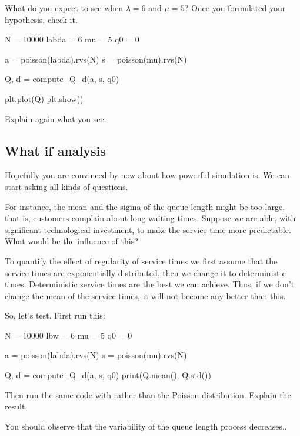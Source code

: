 \begin{exercise}
What do you expect to see when $\lambda=6$ and $\mu=5$? Once you formulated your hypothesis, check it.

\begin{pyverbatim}
N = 10000
labda = 6
mu = 5
q0 = 0

a = poisson(labda).rvs(N)
s = poisson(mu).rvs(N)

Q, d = compute_Q_d(a, s, q0)

plt.plot(Q)
plt.show()
  \end{pyverbatim}
Explain again what you see.
\end{exercise}

\subsection{What if analysis}
\label{sec:what-if-analysis}

Hopefully you  are  convinced by now about how powerful simulation is.  We can start asking all kinds of questions.

\begin{exercise}
  For instance,  the mean and the sigma of the queue length might be too large, that is, customers complain about long waiting times.  Suppose we are able, with significant technological investment, to make the service time more predictable. What would be the influence of this?

To quantify the effect of regularity of service times we first assume that the service times are exponentially distributed, then we change it to deterministic times.
 Deterministic service times are the best we can achieve. Thus, if we don't change the mean of the service times, it will not become any better than this.


So, let's test. First run this:
\begin{pyverbatim}
N = 10000
lbw = 6
mu = 5
q0 = 0

a = poisson(labda).rvs(N)
s = poisson(mu).rvs(N)

Q, d = compute_Q_d(a, s, q0)
print(Q.mean(), Q.std())
\end{pyverbatim}
Then run the same code with  rather than the Poisson distribution. Explain the result.
\begin{solution}
	You should observe that the variability of the queue length process decreases..
\end{solution}
\end{exercise}



